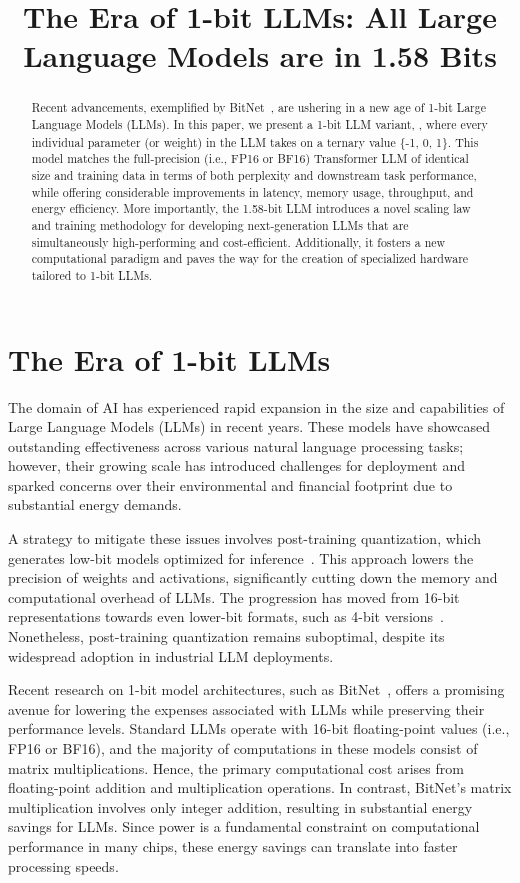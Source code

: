 \title{The Era of 1-bit LLMs: All Large Language Models are in 1.58 Bits}

\begin{abstract}
Recent advancements, exemplified by BitNet~\cite{bitnet}, are ushering in a new age of 1-bit Large Language Models (LLMs). In this paper, we present a 1-bit LLM variant, \textbf{}, where every individual parameter (or weight) in the LLM takes on a ternary value \{-1, 0, 1\}. This model matches the full-precision (i.e., FP16 or BF16) Transformer LLM of identical size and training data in terms of both perplexity and downstream task performance, while offering considerable improvements in latency, memory usage, throughput, and energy efficiency. More importantly, the 1.58-bit LLM introduces a novel scaling law and training methodology for developing next-generation LLMs that are simultaneously high-performing and cost-efficient. Additionally, it fosters a new computational paradigm and paves the way for the creation of specialized hardware tailored to 1-bit LLMs.
\end{abstract}

\section{The Era of 1-bit LLMs}

The domain of AI has experienced rapid expansion in the size and capabilities of Large Language Models (LLMs) in recent years. These models have showcased outstanding effectiveness across various natural language processing tasks; however, their growing scale has introduced challenges for deployment and sparked concerns over their environmental and financial footprint due to substantial energy demands.

A strategy to mitigate these issues involves post-training quantization, which generates low-bit models optimized for inference~\cite{smoothquant, gptq, quip, quip_sharp}. This approach lowers the precision of weights and activations, significantly cutting down the memory and computational overhead of LLMs. The progression has moved from 16-bit representations towards even lower-bit formats, such as 4-bit versions~\cite{gptq, awq}. Nonetheless, post-training quantization remains suboptimal, despite its widespread adoption in industrial LLM deployments.

Recent research on 1-bit model architectures, such as BitNet~\cite{bitnet}, offers a promising avenue for lowering the expenses associated with LLMs while preserving their performance levels. Standard LLMs operate with 16-bit floating-point values (i.e., FP16 or BF16), and the majority of computations in these models consist of matrix multiplications. Hence, the primary computational cost arises from floating-point addition and multiplication operations. In contrast, BitNet's matrix multiplication involves only integer addition, resulting in substantial energy savings for LLMs. Since power is a fundamental constraint on computational performance in many chips, these energy savings can translate into faster processing speeds.

